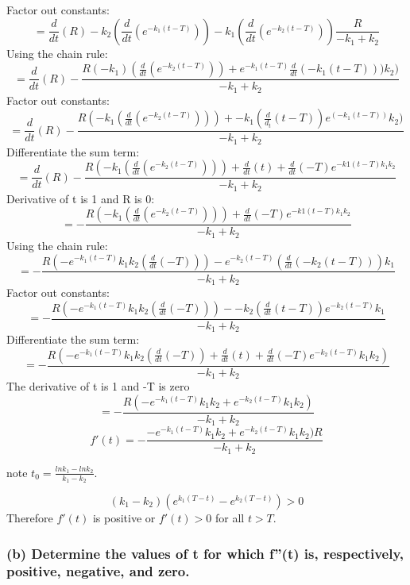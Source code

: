 \documentclass[]{article}
\begin{document}
Factor out constants:
\[=\frac{d}{dt}(R) - k_2(\frac{d}{dt}(e^{-k_1(t - T)})) - k_1 (\frac{d}{dt}(e^{-k_2(t-T)})) \frac{R}{-k_1 + k_2}\]
Using the chain rule:
\[=\frac{d}{dt}(R)-\frac{R(-k_1)(\frac{d}{dt}(e^{-k_2(t-T)})) + e^{-k_1(t-T)}\frac{d}{dt}(-k_1(t-T)))k_2)}{-k_1+ k_2}\]
Factor out constants:
\[=\frac{d}{dt}(R) - \frac{R(-k_1(\frac{d}{dt}(e^{-k_2(t-T)})))+-k_1(\frac{d}{d_t}(t-T))e^(-k_1(t-T))k_2)}{-k_1 + k_2}\]
Differentiate the sum term:
\[=\frac{d}{dt}(R) - \frac{R(-k_1(\frac{d}{dt}(e^{-k_2(t-T)})))+ \frac{d}{dt}(t) + \frac{d}{dt}(-T)e^{-k1(t-T)k_1 k_2}}{-k_1 + k_2}\]
Derivative of t is 1 and R is 0:
\[=- \frac{R(-k_1(\frac{d}{dt}(e^{-k_2(t-T)})))+ \frac{d}{dt}(-T)e^{-k1(t-T)k_1 k_2}}{-k_1 + k_2}\]
Using the chain rule:
\[=-\frac{R(-e^{-k_1 (t-T)}k_1 k_2(\frac{d}{dt}(-T)))- e^{-k_2(t-T)}(\frac{d}{dt}(-k_2(t-T)))k_1}{-k_1 + k_2}\]
Factor out constants:
\[=-\frac{R(-e^{-k_1 (t-T)}k_1 k_2(\frac{d}{dt}(-T)))- -k_2(\frac{d}{dt}(t-T))e^{-k_2 (t-T)}k_1}{-k_1 + k_2}\]
Differentiate the sum term:
\[=-\frac{R(-e^{-k_1(t-T)}k_1 k_2(\frac{d}{dt}(-T)) + \frac{d}{dt}(t)+\frac{d}{dt}(-T)e^{-k_2(t-T)}k_1 k_2)}{-k_1 + k_2}\]
The derivative of t is 1 and -T is zero
\[=-\frac{R(-e^{-k_1(t-T)}k_1 k_2 + e^{-k_2(t-T)}k_1 k_2)}{-k_1 + k_2}\]
\[f'(t)=-\frac{-e^{-k_1 (t -T)}k_1 k_2 + e^{-k_2(t-T)}k_1 k_2)R}{-k_1 + k_2}\]

note \(t_0 = \frac{ln k_1 - ln k_2}{k_1 - k_2}\).

\[(k_1 - k_2)(e^{k_1 (T-t)}-e^{k_2(T-t)})>0\] Therefore \(f'(t)\) is
positive or \(f'(t) > 0\) for all \(t > T\).

\subsubsection{(b) Determine the values of t for which f''(t) is,
respectively, positive, negative, and
zero.}\label{b-determine-the-values-of-t-for-which-ft-is-respectively-positive-negative-and-zero.}
\end{document}
